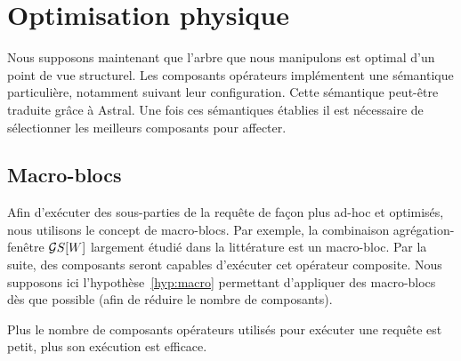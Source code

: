 \section{Optimisation physique}\label{sec:contrib:astronef:physique}
Nous supposons maintenant que l'arbre que nous manipulons est optimal d'un point de vue structurel. Les composants opérateurs implémentent une sémantique particulière, notamment suivant leur configuration. Cette sémantique peut-être traduite grâce à Astral. Une fois ces sémantiques établies il est nécessaire de sélectionner les meilleurs composants pour affecter.
\subsection{Macro-blocs}
Afin d'exécuter des sous-parties de la requête de façon plus ad-hoc et optimisés, nous utilisons le concept de macro-blocs. Par exemple, la combinaison agrégation-fenêtre $\mathcal{G} S[W]$ largement étudié dans la littérature est un macro-bloc. Par la suite, des composants seront capables d'exécuter cet opérateur composite. Nous supposons ici l'hypothèse~\ref{hyp:macro} permettant d'appliquer des macro-blocs dès que possible (afin de réduire le nombre de composants).
\begin{hyp}\label{hyp:macro}
    Plus le nombre de composants opérateurs utilisés pour exécuter une requête est petit, plus son exécution est efficace.
\end{hyp}

